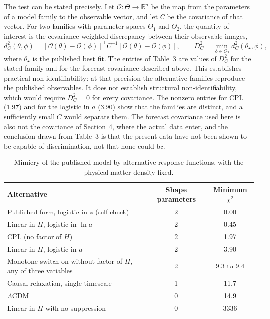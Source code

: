 \documentclass[11pt]{article}
\begin{document}
The test can be stated precisely. Let $\mathcal O:\Theta\to\mathbb R^n$ be the map from the parameters of a model family to the observable vector, and let $C$ be the covariance of that vector. For two families with parameter spaces $\Theta_1$ and $\Theta_2$, the quantity of interest is the covariance-weighted discrepancy between their observable images,
\begin{equation}
d_C^2(\theta,\phi)=\left[\mathcal O(\theta)-\mathcal O(\phi)\right]^{\top}C^{-1}\left[\mathcal O(\theta)-\mathcal O(\phi)\right],\qquad D_C^2=\min_{\phi\in\Theta_2}d_C^2(\theta_\star,\phi),
\end{equation}
where $\theta_\star$ is the published best fit. The entries of Table~3 are values of $D_C^2$ for the stated family and for the forecast covariance described above. This establishes practical non-identifiability: at that precision the alternative families reproduce the published observables. It does not establish structural non-identifiability, which would require $D_C^2=0$ for every covariance. The nonzero entries for CPL (1.97) and for the logistic in $a$ (3.90) show that the families are distinct, and a sufficiently small $C$ would separate them. The forecast covariance used here is also not the covariance of Section~4, where the actual data enter, and the conclusion drawn from Table~3 is that the present data have not been shown to be capable of discrimination, not that none could be.

\begin{table}[h]
\centering
\begin{tabular}{p{9cm}cc}
\toprule
Alternative & Shape parameters & Minimum $\chi^2$\\
\midrule
Published form, logistic in $z$ (self-check) & 2 & 0.00\\
Linear in $H$, logistic in $\ln a$ & 2 & 0.45\\
CPL (no factor of $H$) & 2 & 1.97\\
Linear in $H$, logistic in $a$ & 2 & 3.90\\
Monotone switch-on without factor of $H$, any of three variables & 2 & 9.3 to 9.4\\
Causal relaxation, single timescale & 1 & 11.7\\
$\Lambda$CDM & 0 & 14.9\\
Linear in $H$ with no suppression & 0 & 3336\\
\bottomrule
\end{tabular}
\caption{Mimicry of the published model by alternative response functions, with the physical matter density fixed.}
\end{table}
\end{document}
